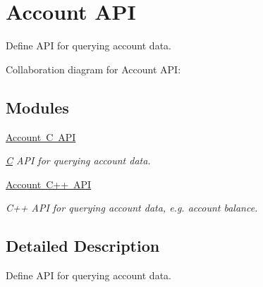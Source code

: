 \hypertarget{group__accountapi}{}\section{Account A\+PI}
\label{group__accountapi}


Define A\+PI for querying account data.  


Collaboration diagram for Account A\+PI\+:
\subsection*{Modules}
\begin{DoxyCompactItemize}
\item 
\mbox{\hyperlink{group__accountcapi}{Account C A\+PI}}
\begin{DoxyCompactList}\small\item\em \mbox{\hyperlink{struct_c}{C}} A\+PI for querying account data. \end{DoxyCompactList}\item 
\mbox{\hyperlink{group__accountcppapi}{Account C++ A\+PI}}
\begin{DoxyCompactList}\small\item\em C++ A\+PI for querying account data, e.\+g. account balance. \end{DoxyCompactList}\end{DoxyCompactItemize}


\subsection{Detailed Description}
Define A\+PI for querying account data. 

